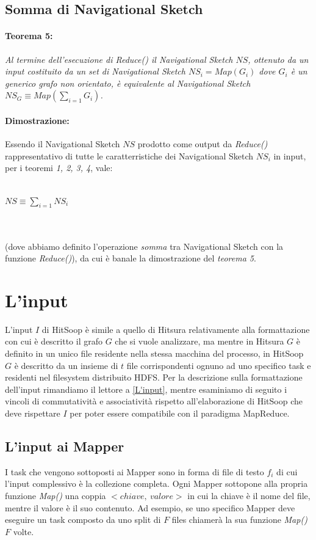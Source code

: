 \documentclass[a4paper,11pt]{report}
\begin{document}
\subsection{Somma di Navigational Sketch}
\paragraph{Teorema 5:}\emph{Al termine dell'esecuzione di \emph{Reduce()} il Navigational Sketch $NS$, ottenuto da un input costituito da un
set di Navigational 
Sketch $NS_i=Map\left(G_i\right)$ dove $G_i$ è un generico grafo
non orientato, è equivalente al Navigational Sketch $NS_G\equiv Map\left(\sum_{i=1}G_i\right)$.}
\paragraph{Dimostrazione:} Essendo il Navigational Sketch $NS$ prodotto come output da \emph{Reduce()} rappresentativo di tutte le
caratterristiche dei Navigational Sketch $NS_i$ in input, per i teoremi
\emph{1, 2, 3, 4}, vale:\\\\
\centerline{$NS\equiv \sum_{i=1} NS_i$}
\\\\
(dove abbiamo definito l'operazione \emph{somma} tra Navigational Sketch con la funzione \emph{Reduce()}), da cui è banale la dimostrazione
del \emph{teorema 5}.

\section{L'input}
L'input $I$ di HitSoop è simile a quello di Hitsura relativamente alla formattazione con cui è descritto il grafo $G$ che si vuole
analizzare, ma mentre in Hitsura $G$ è definito in un unico file residente
nella stessa macchina del processo, in HitSoop $G$ è descritto da un insieme di $t$ file corrispondenti ognuno ad uno specifico task e
residenti nel filesystem distribuito HDFS. 
Per la descrizione sulla formattazione dell'input rimandiamo il lettore a \ref{L'input}, mentre esaminiamo
di seguito i vincoli di commutatività e associatività rispetto all'elaborazione di HitSoop che deve rispettare $I$ per poter essere
compatibile con il paradigma MapReduce.
\subsection{L'input ai Mapper}
I task che vengono sottoposti ai Mapper sono in forma di file di testo $f_i$ di cui l'input complessivo è la collezione completa. Ogni
Mapper sottopone alla propria funzione \emph{Map()} una coppia 
$<chiave,\ valore>$ in cui la chiave è il nome del file, mentre il valore è il suo contenuto. Ad esempio, se uno specifico Mapper deve
eseguire un task composto da uno split di $F$ files chiamerà 
la sua funzione \emph{Map()} $F$ volte.
\end{document}
